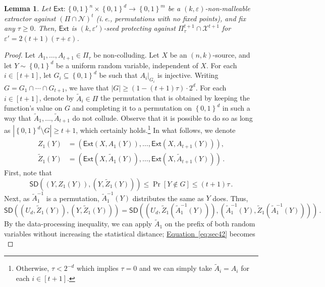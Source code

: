 \documentclass[11pt]{article}
\numberwithin{equation}{section}
\newtheorem{lemma}[theorem]{Lemma}
\theoremstyle{definition}
\theoremstyle{plain}
\newcommand{\ie}{i.\,e.}
\newcommand{\expeqref}[2]{\hyperref[#2]{#1~\eqref{#2}}}
\newcommand{\ext}{\mathsf{Ext}}
\newcommand{\eps}{\varepsilon}
\newcommand{\set}[1]{\left\{{#1}\right\}}
\newcommand{\B}{\set{0,1}}
\def\SD{\ensuremath{\mathsf{SD}}}
\begin{document}
\begin{lemma}\label{lem:nm-to-sp}
Let $\ext \colon \B^{n} \times \B^{d} \rightarrow \B^{m}$ be a $(k,\eps)$-non-malleable extractor
against $\left( \Pi \cap \mathcal{N} \right)^t$ (\ie, permutations with no fixed points), and fix any $\tau \ge 0$. Then, $\ext$ is $(k,\eps')$-seed protecting against $\Pi^{t+1}_{\tau}  \cap \mathcal{X}^{t+1}$ for
$\eps' = 2(t+1)(\tau+\eps)$.
\end{lemma}
\begin{proof}
Let $A_1,\ldots,A_{t+1} \in \Pi_{\tau}$ be non-colluding. Let $X$ be an $(n,k)$-source, and let $Y \sim \B^{d}$ be 
a uniform random variable, independent of $X$. 
For each $i \in [t+1]$, let $G_i \subseteq \B^{d}$ be such that $A_{i}|_{G_i}$ is injective.
Writing $G = G_{1} \cap \cdots \cap G_{t+1}$, we have that $|G| \ge (1-(t+1)\tau) \cdot 2^{d}$.
%
For each $i \in [t+1]$, denote by $\widetilde{A}_{i} \in \Pi$ the permutation that is obtained by
keeping the function's value on $G$ and completing it to a permutation on $\B^d$ in such a way
that $\widetilde{A}_1,\ldots,\widetilde{A}_{t+1}$ do not collude. Observe that it is possible to do so as long as
$\left|\B^{d} \setminus G\right| \ge t+1$, which certainly holds.\footnote{Otherwise,
$\tau < 2^{-d}$ which implies $\tau = 0$ and we can simply take $\widetilde{A}_i = A_i$
for each $i \in [t+1]$.} 
%
In what follows, we denote
\begin{align*}
Z_1(Y) &= ( \ext(X,A_{1}(Y)),\ldots,\ext(X,A_{t+1}(Y)) ),\\
\widetilde{Z}_1(Y) &= ( \ext(X,\widetilde{A}_{1}(Y)),\ldots,\ext(X,\widetilde{A}_{t+1}(Y)) )\,.
\end{align*}
First, note that
\begin{equation}\label{eq:sec41}
\SD((Y,Z_1(Y)),(Y,\widetilde{Z}_1(Y))) \le \Pr[Y \notin G] \le (t+1)\tau\,.
\end{equation}
Next, as $\widetilde{A}_{1}^{-1}$ is a permutation, $\widetilde{A}_{1}^{-1}(Y)$  distributes the same as $Y$ does. Thus,
\begin{equation}\label{eq:sec42}
\SD((U_d,\widetilde{Z}_1(Y)),(Y,\widetilde{Z}_1(Y))) = 
\SD((U_d,\widetilde{Z}_1(\widetilde{A}_{1}^{-1}(Y))),(\widetilde{A}_{1}^{-1}(Y),\widetilde{Z}_1(\widetilde{A}_{1}^{-1}(Y))))\,.
\end{equation}
By the data-processing inequality,
we can apply $\widetilde{A}_1$ on the prefix of both random variables without increasing
the statistical distance; \expeqref{Equation}{eq:sec42} becomes
\begin{equation}\label{eq:sec423}

\end{equation}
\end{proof}
\end{document}
